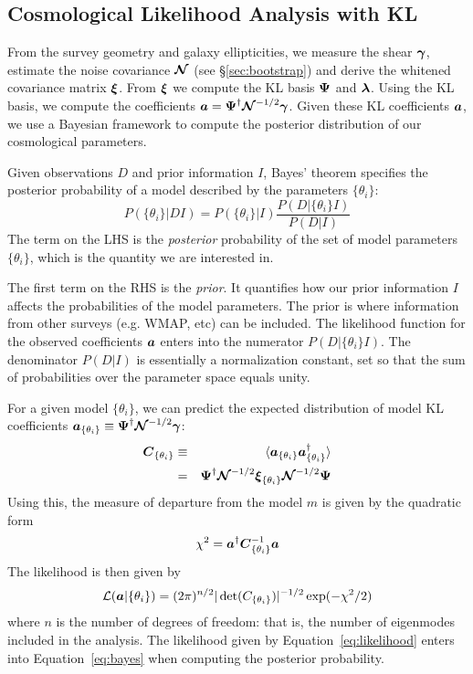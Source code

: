 \subsection{Cosmological Likelihood Analysis with KL}
From the survey geometry and galaxy ellipticities, we measure the
shear $\boldsymbol{\gamma}$, estimate the noise covariance
$\boldsymbol{\mathcal{N}}$ (see \S\ref{sec:bootstrap}) and derive
the whitened covariance matrix $\boldsymbol{\xi}$. 
From $\boldsymbol{\xi}$ we compute the KL basis $\boldsymbol{\Psi}$ and $\boldsymbol{\lambda}$.
Using the KL basis, we compute the coefficients
$\boldsymbol{a} = \boldsymbol{\Psi}^\dagger \boldsymbol{\mathcal{N}}^{-1/2} \boldsymbol{\gamma}$.
Given these KL coefficients $\boldsymbol{a}$, we use a Bayesian framework to
compute the posterior distribution of our cosmological parameters.

Given observations $D$ and prior information $I$, Bayes' theorem specifies the
posterior probability of a model described by the parameters $\{\theta_i\}$:
\begin{equation}
  \label{eq:bayes}
  P(\{\theta_i\}|DI) = P(\{\theta_i\}|I) \frac{P(D|\{\theta_i\}I)}{P(D|I)}
\end{equation}
The term on the LHS is the \textit{posterior} probability of the set of
model parameters $\{\theta_i\}$, which is the quantity we are interested in.

The first term on the RHS is the \textit{prior}.  It quantifies how our prior
information $I$ affects the probabilities of the model parameters.  The 
prior is where information from other surveys (e.g. WMAP, etc) can be
included. The likelihood function for the observed coefficients $\boldsymbol{a}$
enters into the numerator $P(D|\{\theta_i\}I)$.  The denominator $P(D|I)$
is essentially a normalization constant, set so that the sum of probabilities
over the parameter space equals unity.

For a given model $\{\theta_i\}$, we can predict the expected distribution of model KL
coefficients $\boldsymbol{a}_{\{\theta_i\}} \equiv \boldsymbol{\Psi}^\dagger
\boldsymbol{\mathcal{N}}^{-1/2}\boldsymbol{\gamma}$:
\begin{eqnarray}
  \boldsymbol{C}_{\{\theta_i\}}
  & \equiv & \langle\boldsymbol{a}_{\{\theta_i\}}
  \boldsymbol{a}_{\{\theta_i\}}^\dagger\rangle\nonumber\\
  &=& \boldsymbol{\Psi}^\dagger \boldsymbol{\mathcal{N}}^{-1/2} 
  \boldsymbol{\xi}_{\{\theta_i\}}\boldsymbol{\mathcal{N}}^{-1/2}\boldsymbol{\Psi}
\end{eqnarray}
Using this, the measure of departure from the model $m$ is given by the
quadratic form
\begin{equation}
  \chi^2 = \boldsymbol{a}^\dagger\boldsymbol{C}_{\{\theta_i\}}^{-1}\boldsymbol{a}
\end{equation}
The likelihood is then given by
\begin{equation}
  \label{eq:likelihood}
  \mathcal{L}(\boldsymbol{a}|\{\theta_i\}) = 
  (2\pi)^{n/2} |\det(C_{\{\theta_i\}})|^{-1/2}
  \exp(-\chi^2/2)
\end{equation}
where $n$ is the number of degrees of freedom: that is, the number
of eigenmodes included in the analysis.  The likelihood given by
Equation~\ref{eq:likelihood} enters into Equation~\ref{eq:bayes} when
computing the posterior probability.

